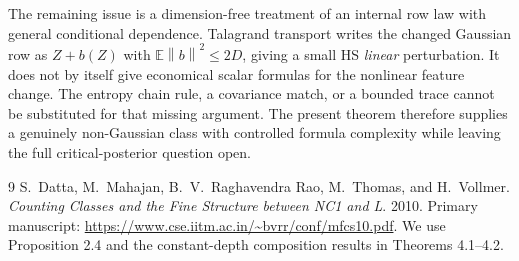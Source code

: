 \documentclass[11pt]{article}
\newcommand{\E}{\mathbb E}
\newcommand{\norm}[1]{\left\lVert #1\right\rVert}
\begin{document}
The remaining issue is a dimension-free treatment of an internal row law with general conditional dependence. Talagrand transport writes the changed Gaussian row as $Z+b(Z)$ with $\E\norm b^2\le2D$, giving a small HS \emph{linear} perturbation. It does not by itself give economical scalar formulas for the nonlinear feature change. The entropy chain rule, a covariance match, or a bounded trace cannot be substituted for that missing argument. The present theorem therefore supplies a genuinely non-Gaussian class with controlled formula complexity while leaving the full critical-posterior question open.

\begin{thebibliography}{9}
 S.~Datta, M.~Mahajan, B.~V.~Raghavendra Rao, M.~Thomas, and H.~Vollmer. \emph{Counting Classes and the Fine Structure between NC1 and L}. 2010. Primary manuscript: \url{https://www.cse.iitm.ac.in/~bvrr/conf/mfcs10.pdf}. We use Proposition 2.4 and the constant-depth composition results in Theorems 4.1--4.2.
\end{thebibliography}
\end{document}
